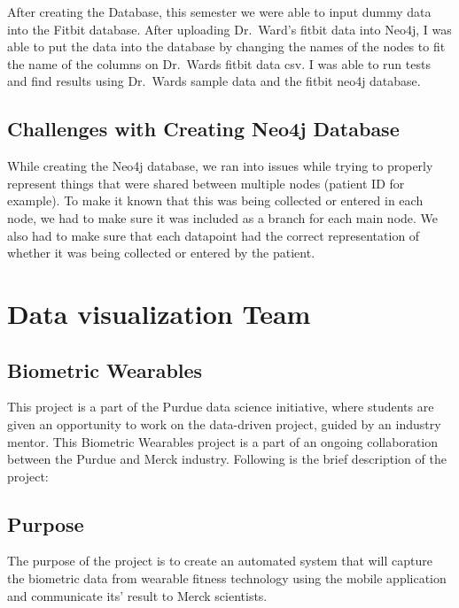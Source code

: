 \documentclass[]{book}
\begin{document}
After creating the Database, this semester we were able to input dummy data into the Fitbit database. After uploading Dr.~Ward's fitbit data into Neo4j, I was able to put the data into the database by changing the names of the nodes to fit the name of the columns on Dr.~Wards fitbit data csv. I was able to run tests and find results using Dr.~Wards sample data and the fitbit neo4j database.

\hypertarget{challenges-with-creating-neo4j-database}{%
\section{Challenges with Creating Neo4j Database}\label{challenges-with-creating-neo4j-database}}

While creating the Neo4j database, we ran into issues while trying to properly represent things that were shared between multiple nodes (patient ID for example). To make it known that this was being collected or entered in each node, we had to make sure it was included as a branch for each main node. We also had to make sure that each datapoint had the correct representation of whether it was being collected or entered by the patient.

\hypertarget{data-visualization-team}{%
\chapter{Data visualization Team}\label{data-visualization-team}}

\hypertarget{biometric-wearables}{%
\section{Biometric Wearables}\label{biometric-wearables}}

This project is a part of the Purdue data science initiative, where students are given an opportunity to work on the data-driven project, guided by an industry mentor. This Biometric Wearables project is a part of an ongoing collaboration between the Purdue and Merck industry. Following is the brief description of the project:

\hypertarget{purpose}{%
\section{Purpose}\label{purpose}}

The purpose of the project is to create an automated system that will capture the biometric data from wearable fitness technology using the mobile application and communicate its' result to Merck scientists.
\end{document}
